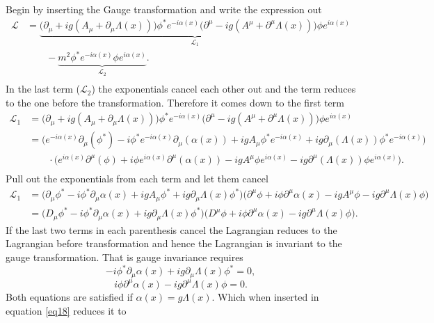 \begin{example}
	Begin by inserting the Gauge transformation and write the expression out
	\begin{equation}
		\begin{split}
			\mathcal{L}&=\underbrace{\bigg(\partial_\mu+ig(A_\mu+\partial_\mu\Lambda(x))\bigg)\phi^* e^{-i\alpha(x)}\bigg(\partial^\mu-ig(A^\mu+\partial^\mu\Lambda(x))\bigg)\phi e^{i\alpha(x)}}_{\mathcal{L}_1}\\
			&\qquad-\underbrace{m^2\phi^* e^{-i\alpha(x)}\phi e^{i\alpha(x)}}_{\mathcal{L}_2}.\\
		\end{split}
		\label{eq18}
	\end{equation} 
	In the last term ($\mathcal{L}_2$) the exponentials cancel each other out and the term reduces to the one before the transformation. Therefore it comes down to the first term
	\begin{equation}
		\begin{split}
			\mathcal{L}_1&=\bigg(\partial_\mu+ig(A_\mu+\partial_\mu\Lambda(x))\bigg)\phi^* e^{-i\alpha(x)}\bigg(\partial^\mu-ig(A^\mu+\partial^\mu\Lambda(x))\bigg)\phi e^{i\alpha(x)}\\
			&=\bigg(e^{-i\alpha(x)}\partial_\mu(\phi^*)-i\phi^*e^{-i\alpha(x)}\partial_\mu(\alpha(x))+igA_\mu\phi^*e^{-i\alpha(x)}+ig\partial_\mu(\Lambda(x))\phi^* e^{-i\alpha(x)}\bigg)\\
			&\qquad\cdot \bigg(e^{i\alpha(x)}\partial^\mu(\phi)+i\phi e^{i\alpha(x)}\partial^\mu(\alpha(x))-igA^\mu\phi e^{i\alpha(x)}-ig\partial^\mu(\Lambda(x))\phi e^{i\alpha(x)}\bigg).\\
		\end{split}
		\label{mother}
	\end{equation} 
	Pull out the exponentials from each term and let them cancel
	\begin{equation}
		\begin{split}
			\mathcal{L}_1&=\bigg(\partial_\mu\phi^*-i\phi^*\partial_\mu\alpha(x)+igA_\mu\phi^*+ig\partial_\mu\Lambda(x)\phi^* \bigg) \bigg(\partial^\mu\phi+i\phi \partial^\mu\alpha(x)-igA^\mu\phi -ig\partial^\mu\Lambda(x)\phi \bigg)\\
			&=\bigg(D_\mu\phi^*-i\phi^*\partial_\mu\alpha(x)+ig\partial_\mu\Lambda(x)\phi^* \bigg) \bigg(D^\mu\phi+i\phi \partial^\mu\alpha(x) -ig\partial^\mu\Lambda(x)\phi \bigg).
		\end{split}
	\end{equation} 
	If the last two terms in each parenthesis cancel the Lagrangian reduces to the Lagrangian before transformation and hence the Lagrangian is invariant to the gauge transformation. That is gauge invariance requires
	\begin{equation}
		-i\phi^*\partial_\mu\alpha(x)+ig\partial_\mu\Lambda(x)\phi^* =0,
	\end{equation} 
	\begin{equation}
		i\phi \partial^\mu\alpha(x)-ig\partial^\mu\Lambda(x)\phi =0.
	\end{equation} 
	Both equations are satisfied if $\alpha(x)=g\Lambda(x)$. Which when inserted in equation \ref{eq18} reduces it to 
\end{example}
